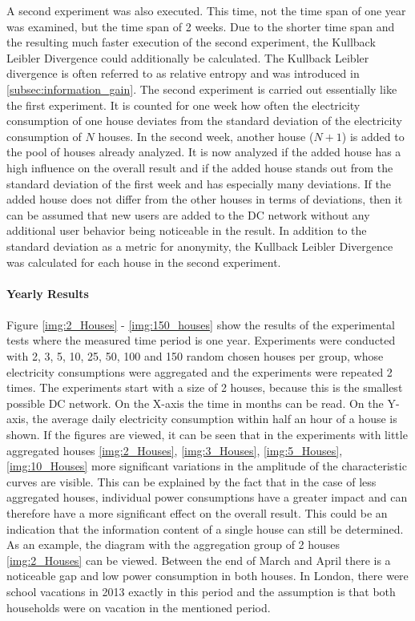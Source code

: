 A second experiment was also executed. This time, not the time span of one year was examined, but the time span of 2 weeks. Due to the shorter time span and the resulting much faster execution of the second experiment, the Kullback Leibler Divergence could additionally be calculated. 
The Kullback Leibler divergence is often referred to as relative entropy and was introduced in \ref{subsec:information_gain}.
The second experiment is carried out essentially like the first experiment. It is counted for one week how often the electricity consumption of one house deviates from the standard deviation of the electricity consumption of $N$ houses. In the second week, another house ($N+1$) is added to the pool of houses already analyzed. It is now analyzed if the added house has a high influence on the overall result and if the added house stands out from the standard deviation of the first week and has especially many deviations. If the added house does not differ from the other houses in terms of deviations, then it can be assumed that new users are added to the DC network without any additional user behavior being noticeable in the result. In addition to the standard deviation as a metric for anonymity, the Kullback Leibler Divergence was calculated for each house in the second experiment. 
\\
\\
\textbf{Yearly Results}
\\
\\
Figure \ref{img:2_Houses} - \ref{img:150_houses} show the results of the experimental tests where the measured time period is one year. Experiments were conducted with 2, 3, 5, 10, 25, 50, 100 and 150 random chosen houses per group, whose electricity consumptions were aggregated and the experiments were repeated 2 times. The experiments start with a size of 2 houses, because this is the smallest possible DC network. On the X-axis the time in months can be read. On the Y-axis, the average daily electricity consumption within half an hour of a house is shown. If the figures are viewed, it can be seen that in the experiments with little aggregated houses \ref{img:2_Houses}, \ref{img:3_Houses}, \ref{img:5_Houses}, \ref{img:10_Houses} more significant variations in the amplitude of the characteristic curves are visible. This can be explained by the fact that in the case of less aggregated houses, individual power consumptions have a greater impact and can therefore have a more significant effect on the overall result. This could be an indication that the information content of a single house can still be determined. As an example, the diagram  with the aggregation group of 2 houses \ref{img:2_Houses} can be viewed. Between the end of March and April there is a noticeable gap and low power consumption in both houses. In London, there were school vacations in 2013 exactly in this period and the assumption is that both households were on vacation in the mentioned period.\\

